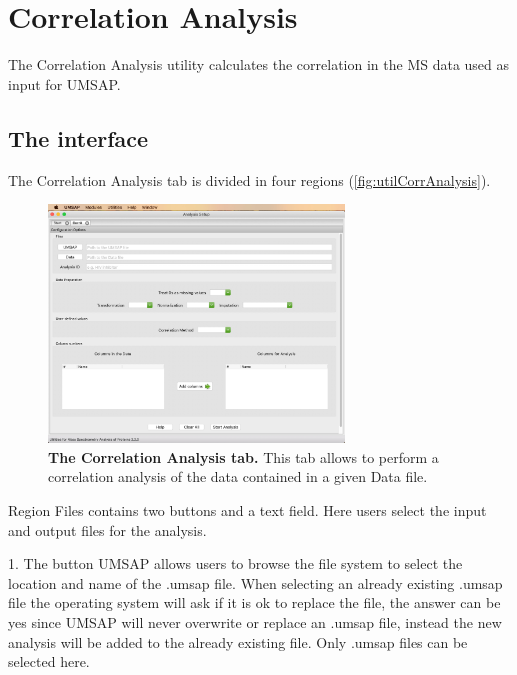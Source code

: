 \chapter{Correlation Analysis}
\label{chap:corrA}

The Correlation Analysis utility calculates the correlation in the MS data used
as input for UMSAP.

\section{The interface}

The Correlation Analysis tab is divided in four regions (\autoref{fig:utilCorrAnalysis}).

\begin{figure}[h]
    \centering
    \includegraphics[width=0.7\textwidth]{./IMAGES/UTIL-CORR-WINDOW/util-corr.jpg}
    \caption[The Correlation Analysis tab]{\textbf{The Correlation Analysis tab.}
    This tab allows to perform a correlation analysis of the data contained in a
    given Data file.} 
    \label{fig:utilCorrAnalysis}
    \vspace{-5pt}
\end{figure}

Region Files contains two buttons and a text field. Here users select the input
and output files for the analysis.

\num{1}. The button UMSAP allows users to browse the file system to select the location
and name of the .umsap file. When selecting an already existing .umsap file the operating
system will ask if it is ok to replace the file, the answer can be yes since UMSAP
will never overwrite or replace an .umsap file, instead the new analysis will be
added to the already existing file. Only .umsap files can be selected here.

